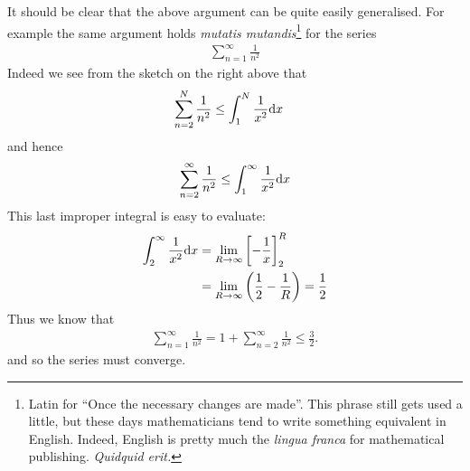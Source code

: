 \begin{eg}
It should be clear that the above argument can be quite easily
generalised. For example the same argument holds
\emph{mutatis mutandis}\footnote{Latin for ``Once the necessary changes
are made''. This phrase still gets used a little, but
these days mathematicians tend to write something equivalent in English. Indeed, English is pretty much the \emph{lingua franca} for
mathematical publishing. \emph{Quidquid erit.}} for the series
\begin{align*}
  \sum_{n=1}^\infty \frac{1}{n^2}
\end{align*}
Indeed we see from the sketch on the right above that
\begin{align*}
  \sum_{n=2}^N \frac{1}{n^2}
  &\le \int_1^N \frac{1}{x^2}\mathrm{d}x
\end{align*}
and hence
\begin{align*}
  \sum_{n=2}^\infty \frac{1}{n^2}
   \leq \int_1^\infty \frac{1}{x^2}\mathrm{d}x
\end{align*}
This last improper integral is easy to evaluate:
\begin{align*}
  \int_2^\infty \frac{1}{x^2}\mathrm{d}x
  &= \lim_{R\to\infty} \left[ - \frac{1}{x} \right]_2^R \\
  &= \lim_{R\to\infty} \left( \frac{1}{2} - \frac{1}{R} \right)
  = \frac{1}{2}
\end{align*}
Thus we know that
\begin{align*}
  \sum_{n=1}^\infty \frac{1}{n^2}
 = 1+ \sum_{n=2}^\infty \frac{1}{n^2} \leq \frac{3}{2}.
\end{align*}
and so the series must converge.
\end{eg}


